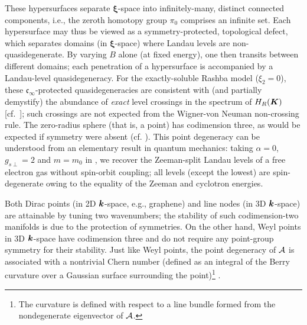 \documentclass[aps, showpacs, twocolumn, notitlepage, superscriptaddress]{revtex4-1}
\begin{document}
These hypersurfaces separate $\boldsymbol{\xi}$-space into infinitely-many, distinct connected components, i.e., the zeroth homotopy group $\pi_0$ comprises an infinite set. Each hypersurface may thus be viewed as a symmetry-protected, topological defect, which separates domains (in $\boldsymbol{\xi}$-space) where Landau levels are non-quasidegenerate. By varying $B$ alone (at fixed energy), one then transits between different domains; each penetration of a hypersurface is accompanied by a Landau-level quasidegeneracy. For the exactly-soluble Rashba model ($\xi_2{=}0$), these $\mathfrak{c}_{\infty}$-protected quasidegeneracies  are consistent with (and partially demystify)  the abundance of \textit{exact} level crossings in the spectrum of $H_R(\boldsymbol{K})$ [cf.\ ]; such crossings are not expected from the Wigner-von Neuman non-crossing rule\cite{neumann2000behaviour}. The zero-radius sphere (that is, a point) has codimension three, as would be expected if symmetry were absent (cf. ). This point degeneracy can be understood from an elementary result in quantum mechanics: taking $\alpha{=}0$, $g_{s\perp}{=}2$ {and} $m{=}m_0$ in , we recover the Zeeman-split Landau levels of a free electron gas without spin-orbit coupling; all levels (except the lowest) are spin-degenerate owing to the equality of the Zeeman and cyclotron energies\cite{landau2013course}.

 Both Dirac points (in 2D $\boldsymbol{k}$-space, e.g., graphene\cite{neto2009electronic}) and line nodes (in 3D $\boldsymbol{k}$-space) are attainable by tuning two wavenumbers; the stability of such codimension-two manifolds is due to the protection of symmetries. On the other hand, Weyl points in 3D $\boldsymbol{k}$-space have codimension three and do not require any point-group symmetry for their stability. Just like Weyl points, the point degeneracy of ${\cal A}$ is associated with a nontrivial Chern number\cite{TKNN} (defined as an integral of the Berry curvature\cite{berry_quantal_1984} over a Gaussian surface surrounding the point)\footnote{The curvature is defined with respect to a line bundle formed from the nondegenerate eigenvector of ${\cal A}$.} .
\end{document}
